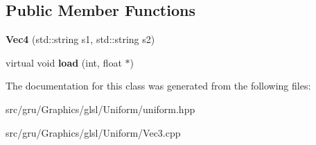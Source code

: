 \subsection*{\-Public \-Member \-Functions}
\begin{DoxyCompactItemize}
\item 
\hypertarget{classglutpp_1_1glsl_1_1Uniform_1_1Vector_1_1Vec4_a56b870866751abb0acd2ddf1a48cb12c}{{\bfseries \-Vec4} (std\-::string s1, std\-::string s2)}\label{classglutpp_1_1glsl_1_1Uniform_1_1Vector_1_1Vec4_a56b870866751abb0acd2ddf1a48cb12c}

\item 
\hypertarget{classglutpp_1_1glsl_1_1Uniform_1_1Vector_1_1Vec4_af60145d1b7c2891fd72fe30b1d45f2b5}{virtual void {\bfseries load} (int, float $\ast$)}\label{classglutpp_1_1glsl_1_1Uniform_1_1Vector_1_1Vec4_af60145d1b7c2891fd72fe30b1d45f2b5}

\end{DoxyCompactItemize}


\-The documentation for this class was generated from the following files\-:\begin{DoxyCompactItemize}
\item 
src/gru/\-Graphics/glsl/\-Uniform/uniform.\-hpp\item 
src/gru/\-Graphics/glsl/\-Uniform/\-Vec3.\-cpp\end{DoxyCompactItemize}
